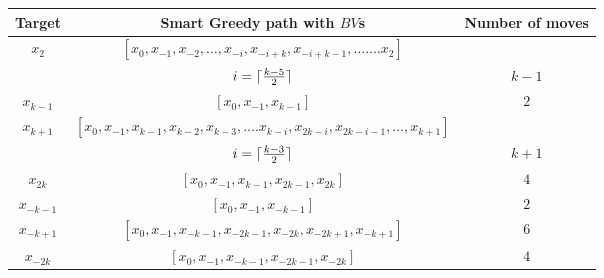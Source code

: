 \begin{center}
  \begin{tabular}{|c|c|c|}
 \hline
 Target & Smart Greedy path with $BV$s & Number of moves\\

 \hline
$x_2$ &$[x_0, x_{-1}, x_{-2},\ldots, x_{-i},x_{-i+k}, x_{-i+k-1},\ldots.... x_2]$ &\\
&$i =  \lceil{{ k-5} \over 2}\rceil$    & $k-1$\\
\hline
 $x_{k-1}$ & $[x_0, x_{-1}, x_{k-1}]$ & $2$ \\

 \hline
 $x_{k+1}$ &  $[x_0, x_{-1}, x_{k-1}, x_{k-2}, x_{k-3},.... x_{k-i}, x_{2k-i}, x_{2k-i-1}, \ldots, x_{k+1}]$ &\\
    &  $i = \lceil{{ k-3} \over 2}\rceil$  & $k+1$\\  
 
 \hline
 $x_{2k}$ & $[x_0, x_{-1}, x_{k-1}, x_{2k-1},x_{2k}]$ & $4$ \\ %
              

\hline

$x_{-k-1}$ &$[x_0, x_{-1}, x_{-k-1}]$ & $2$ \\

\hline
 $x_{-k+1}$ & $[x_0, x_{-1}, x_{-k-1}, x_{-2k-1}, x_{-2k}, x_{-2k+1}, x_{-k+1}]$ & $6$ \\

 \hline
 $x_{-2k}$ &  $[x_0, x_{-1}, x_{-k-1}, x_{-2k-1},x_{-2k}]$ & $4$ \\

 

\hline
\end{tabular} 

 \end{center}

